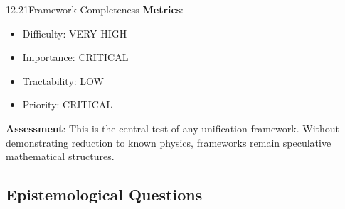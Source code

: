 \begin{openproblem}{12.21}{Framework Completeness}
\textbf{Metrics}:
\begin{itemize}
    \item Difficulty: VERY HIGH
    \item Importance: CRITICAL
    \item Tractability: LOW
    \item Priority: CRITICAL
\end{itemize}

\textbf{Assessment}: This is the central test of any unification framework. Without demonstrating reduction to known physics, frameworks remain speculative mathematical structures.
\end{openproblem}

\subsection{Epistemological Questions}

